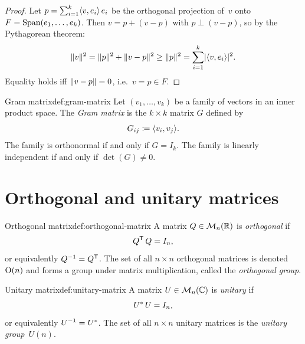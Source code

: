 \begin{proof}
Let $p = \sum_{i=1}^k\langle v,e_i\rangle\,e_i$ be the orthogonal projection
of~$v$ onto $F = \operatorname{Span}(e_1,\ldots,e_k)$.  Then $v = p + (v-p)$ with
$p\perp (v-p)$, so by the Pythagorean theorem:
\[
  \lVert v\rVert^2 = \lVert p\rVert^2 + \lVert v-p\rVert^2 \geq \lVert p\rVert^2
    = \sum_{i=1}^k\lvert\langle v,e_i\rangle\rvert^2.
\]
Equality holds iff $\lVert v-p\rVert = 0$, i.e.\ $v = p\in F$.
\end{proof}

\begin{definition}{Gram matrix}{def:gram-matrix}
Let $(v_1,\ldots,v_k)$ be a family of vectors in an inner product
space.  The \emph{Gram matrix} is the $k\times k$
matrix $G$ defined by
\[
  G_{ij} \coloneqq \langle v_i,v_j\rangle.
\]
The family is orthonormal if and only if $G = I_k$.  The family is
linearly independent if and only if $\det(G)\neq 0$.
\end{definition}


\section{Orthogonal and unitary matrices}\label{sec:orthogonal-unitary}

\begin{definition}{Orthogonal matrix}{def:orthogonal-matrix}
A matrix $Q\in\mathcal{M}_n({\mathbb{R}})$ is \emph{orthogonal} if
\[
  {Q}^{\mathsf{T}}\, Q = I_n,
\]
or equivalently ${Q}^{-1} = {Q}^{\mathsf{T}}$.  The set of all $n\times n$
orthogonal matrices is denoted $\operatorname{O}(n)$ and forms a group under
matrix multiplication, called the \emph{orthogonal group}.
\end{definition}

\begin{definition}{Unitary matrix}{def:unitary-matrix}
A matrix $U\in\mathcal{M}_n({\mathbb{C}})$ is \emph{unitary} if
\[
  {U}^{*}\, U = I_n,
\]
or equivalently ${U}^{-1} = {U}^{*}$.  The set of all $n\times n$
unitary matrices is the \emph{unitary group}~$U(n)$.
\end{definition}

